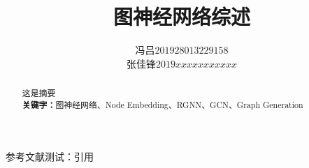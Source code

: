 \documentclass{ctexart}
\title{图神经网络综述}
\author{\begin{tabular}{ll}冯吕 & $201928013229158$\\
	张佳锋 & $2019xxxxxxxxxxx$
\end{tabular}}
\date{}
\begin{document}

\maketitle
{}
\begin{abstract}
 这是摘要\\

\centering
\textbf{关键字：}图神经网络、Node Embedding、RGNN、GCN、Graph Generation
\end{abstract}

参考文献测试：引用\cite{grover2016node2vec}



\end{document}
